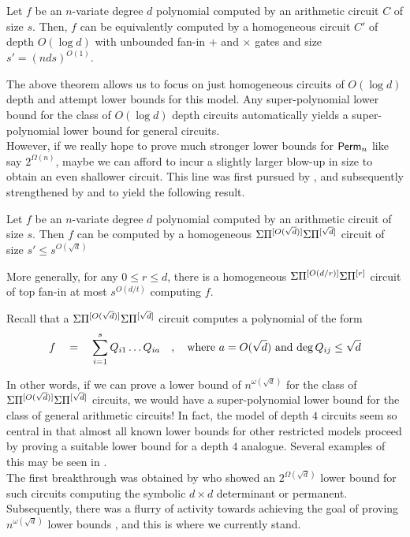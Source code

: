 \begin{theorem}
Let $f$ be an $n$-variate degree $d$ polynomial computed by an arithmetic circuit $C$ of size $s$. 
Then, $f$ can be equivalently computed by a homogeneous circuit $C'$ of depth $O(\log d)$ with unbounded fan-in $+$ and $\times$ gates and size $s' = (nds)^{O(1)}$. 
\end{theorem}


The above theorem allows us to focus on just homogeneous circuits of $O(\log d)$ depth and attempt lower bounds for this model. 
Any super-polynomial lower bound for the class of $O(\log d)$ depth circuits automatically yields a super-polynomial lower bound for general circuits. \\

However, if we really hope to prove much stronger lower bounds for $\operatorname{\mathsf{Perm}}_n$ like say $2^{\Omega(n)}$, maybe we can afford to incur a slightly larger blow-up in size to obtain an even shallower circuit. 
This line was first pursued by \cite{av08}, and subsequently strengthened by \cite{koiran} and \cite{Tav13} to yield the following result. 

\begin{theorem} 
  Let $f$ be an $n$-variate degree $d$ polynomial computed by an arithmetic circuit of size $s$. 
Then $f$ can be computed by a homogeneous $\Sigma\Pi^{[O(\sqrt{d})]}\Sigma\Pi^{[\sqrt{d}]}$ circuit of size $s' \leq s^{O(\sqrt{d})}$

More generally, for any $0\leq r\leq d$, there is a homogeneous $\Sigma\Pi^{[O(d/r)]}\Sigma\Pi^{[r]}$ circuit of top fan-in at most $s^{O(d/t)}$ computing $f$. 
\end{theorem}

Recall that a $\Sigma\Pi^{[O(\sqrt{d})]}\Sigma\Pi^{[\sqrt{d}]}$ circuit computes a polynomial of the form
\[
f\quad = \quad \sum_{i=1}^s Q_{i1}\dots Q_{ia} \quad,\quad \text{where $a = O(\sqrt{d})$ and $\deg Q_{ij} \leq \sqrt{d}$}
\]

In other words, if we can prove a lower bound of $n^{\omega(\sqrt{d})}$ for the class of $\Sigma\Pi^{[O(\sqrt{d})]}\Sigma\Pi^{[\sqrt{d}]}$ circuits, we would have a super-polynomial lower bound for the class of general arithmetic circuits! 
In fact, the model of depth $4$ circuits seem so central in that almost all known lower bounds for other restricted models proceed by proving a suitable lower bound for a depth $4$ analogue. 
Several examples of this may be seen in \cite{KayalRP}. \\

The first breakthrough was obtained by \cite{gkks13} who showed an $2^{\Omega(\sqrt{d})}$ lower bound for such circuits computing the symbolic $d\times d$ determinant or permanent. 
Subsequently, there was a flurry of activity towards achieving the goal of proving $n^{\omega(\sqrt{d})}$ lower bounds \cite{KSS13,FLMS13,KS14a}, and this is where we currently stand. 

